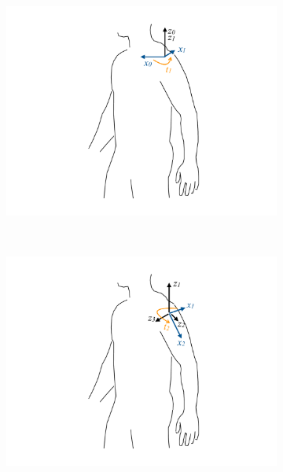 \documentclass[xcolor=x11names]{article}
\begin{document}
\begin{figure}
    \centering
    \begin{subfigure}[b]{0.4\textwidth}
        \includegraphics[trim = 50mm 0mm 50mm 0mm, clip, width=\textwidth]{model_1}
        \caption{}
    \end{subfigure}
    ~ %
    \begin{subfigure}[b]{0.4\textwidth}
        \includegraphics[trim = 50mm 0mm 50mm 0mm, clip, width=\textwidth]{model_2}
        \caption{}
    \end{subfigure}
    \\ %

\end{figure}
\end{document}
